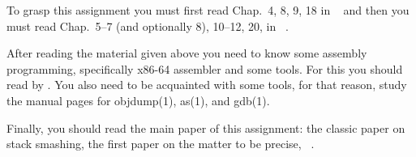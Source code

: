 To grasp this assignment you must first read
Chap.~4, 8, 9, 18 in ~\cite{Anderson2008sea} and 
then you must read Chap.~5--7 (and optionally 8), 10--12, 20, in 
~\cite{Gollmann2011cs}.

After reading the material given above you need to know some assembly 
programming, specifically x86-64 assembler and some tools.
For this you should read  by \citet{assembly}.
You also need to be acquainted with some tools, for that reason, study the 
manual pages for objdump(1), as(1), and gdb(1).

Finally, you should read the main paper of this assignment: the classic paper 
on stack smashing, the first paper on the matter to be precise, 
~\cite{stacksmash}.
